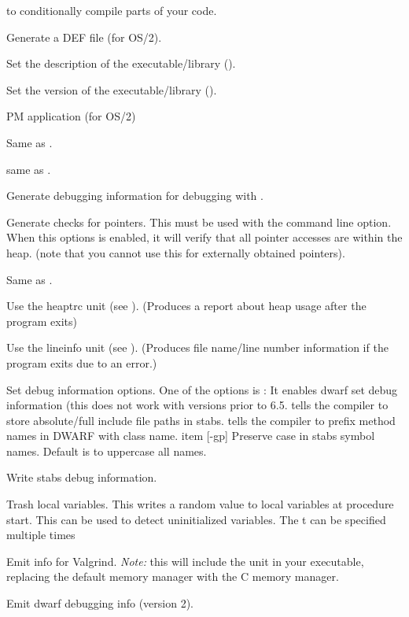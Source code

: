 \begin{description}
to conditionally compile parts of your code.
\item [-D] Generate a DEF file (for OS/2).
\item [-Dd] Set the description of the executable/library (\windows).
\item [-Dv] Set the version of the executable/library (\windows).
\item [-Dw] PM application (for OS/2)
\item [-E]  Same as .
\item [-fPIC] same as .
\item [-g]  Generate debugging information for debugging with
.
\item [-gc] Generate checks for pointers. This must be used with the
 command line option. When this options is enabled, it will verify
that all pointer accesses are within the heap. (note that you cannot use
this for externally obtained pointers).
\item [-gg] Same as .
\item [-gh] Use the heaptrc unit (see \unitsref). (Produces a report
about heap usage after the program exits)
\item [-gl] Use the lineinfo unit (see \unitsref). (Produces file
name/line number information if the program exits due to an error.)
\item[-goXXX] Set debug information options. One of the options is
: It enables dwarf set debug information (this does not work
with  versions prior to 6.5.   tells the compiler to store absolute/full include file paths in stabs.
 tells the compiler to prefix method names in DWARF with class name.
item [-gp] Preserve case in stabs symbol names. Default is to uppercase all
names.
\item [-gs] Write stabs debug information.
\item [-gt] Trash local variables. This writes a random value to local
variables at procedure start. This can be used to detect uninitialized
variables. The t can be specified multiple times
\item [-gv] Emit info for Valgrind. {\em Note:} this will include the 
unit in your executable, replacing the default memory manager with the C memory
manager.
\item [-gw] Emit dwarf debugging info (version 2).

\end{description}

